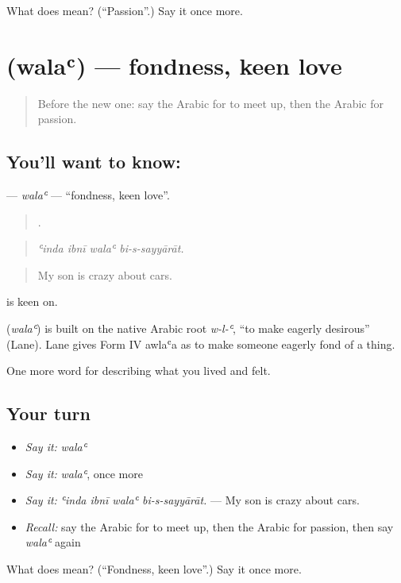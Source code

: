 \begin{tcolorbox}[breakable,colback=teal!4,colframe=teal!35!black,title={Before you move on}]
What does  mean? (\textquotedblleft{}Passion\textquotedblright{}.) Say it once more.
\end{tcolorbox}
\section[\texorpdfstring{\ar{ولع} (walaʿ)}{ولع (walaʿ)}]{ (walaʿ) — fondness, keen love}

\label{lesson:AR-C540-wala}



\begin{quote}
Before the new one: say the Arabic for to meet up, then the Arabic for passion.
\end{quote}

\subsection*{You'll want to know: }
\textbf{} — \emph{walaʿ} — \textquotedblleft{}fondness, keen love\textquotedblright{}.

\begin{quote}
   .
\end{quote}

\begin{quote}
\emph{ʿinda ibnī walaʿ bi-s-sayyārāt.}
\end{quote}

\begin{quote}
My son is crazy about cars.
\end{quote}

  is keen on.

\begin{cousinweb}
\textbf{} (\emph{walaʿ}) is built on the native Arabic root \emph{w-l-ʿ}, \textquotedblleft{}to make eagerly desirous\textquotedblright{} (Lane). Lane gives Form IV awlaʿa as to make someone eagerly fond of a thing.
\end{cousinweb}

\begin{grammarlens}[title={What you've built}]
One more word for describing what you lived and felt.
\end{grammarlens}

\subsection*{Your turn}
\begin{itemize}
\raggedright
  \item \emph{Say it:} \emph{walaʿ}
  \item \emph{Say it:} \emph{walaʿ}, once more
  \item \emph{Say it:} \emph{ʿinda ibnī walaʿ bi-s-sayyārāt.} — My son is crazy about cars.
  \item \emph{Recall:} say the Arabic for to meet up, then the Arabic for passion, then say \emph{walaʿ} again
\end{itemize}

\begin{tcolorbox}[breakable,colback=teal!4,colframe=teal!35!black,title={Before you move on}]
What does  mean? (\textquotedblleft{}Fondness, keen love\textquotedblright{}.) Say it once more.
\end{tcolorbox}

